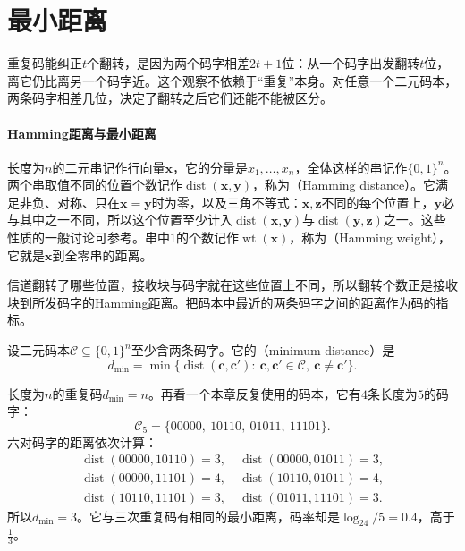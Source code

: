 \section{最小距离}
\label{sec:ccode-min-distance}

重复码能纠正$t$个翻转，是因为两个码字相差$2t+1$位：从一个码字出发翻转$t$位，离它仍比离另一个码字近。这个观察不依赖于“重复”本身。对任意一个二元码本，两条码字相差几位，决定了翻转之后它们还能不能被区分。

\paragraph{Hamming距离与最小距离}
长度为$n$的二元串记作行向量$\bm{x}$，它的分量是$x_1,\dots,x_n$，全体这样的串记作$\{0,1\}^{n}$。两个串取值不同的位置个数记作$\operatorname{dist}(\bm{x},\bm{y})$，称为（Hamming distance）。它满足非负、对称、只在$\bm{x}=\bm{y}$时为零，以及三角不等式：$\bm{x},\bm{z}$不同的每个位置上，$\bm{y}$必与其中之一不同，所以这个位置至少计入$\operatorname{dist}(\bm{x},\bm{y})$与$\operatorname{dist}(\bm{y},\bm{z})$之一。这些性质的一般讨论可参考。串中$1$的个数记作$\operatorname{wt}(\bm{x})$，称为（Hamming weight），它就是$\bm{x}$到全零串的距离。

信道翻转了哪些位置，接收块与码字就在这些位置上不同，所以翻转个数正是接收块到所发码字的Hamming距离。把码本中最近的两条码字之间的距离作为码的指标。

\begin{definition}[最小距离]
\label{def:ccode-min-distance}
设二元码本$\mathcal{C}\subseteq\{0,1\}^{n}$至少含两条码字。它的（minimum distance）是
\begin{equation}
 d_{\min}=\min\bigl\{\operatorname{dist}(\bm{c},\bm{c}'):\ \bm{c},\bm{c}'\in\mathcal{C},\ \bm{c}\neq\bm{c}'\bigr\} .
 \label{eq:ccode-dmin}
\end{equation}
\end{definition}

长度为$n$的重复码$d_{\min}=n$。再看一个本章反复使用的码本，它有$4$条长度为$5$的码字：
\[
 \mathcal{C}_5=\{00000,\ 10110,\ 01011,\ 11101\} .
\]
六对码字的距离依次计算：
\[
 \begin{gathered}
 \operatorname{dist}(00000,10110)=3,\quad \operatorname{dist}(00000,01011)=3,\\
 \operatorname{dist}(00000,11101)=4,\quad \operatorname{dist}(10110,01011)=4,\\
 \operatorname{dist}(10110,11101)=3,\quad \operatorname{dist}(01011,11101)=3 .
 \end{gathered}
\]
所以$d_{\min}=3$。它与三次重复码有相同的最小距离，码率却是$\log_24/5=0.4$，高于$\tfrac13$。


